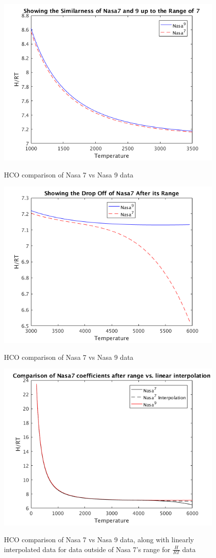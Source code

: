 \documentclass{article}
\begin{document}
\begin{figure}
  \centering
  \includegraphics[width=.8\linewidth]{./NasaPlots/H2.png}
  \label{fig:H2}
  \caption{HCO comparison of Nasa 7 vs Nasa 9 data}
\end{figure}


\begin{figure}
  \centering
  \includegraphics[width=.8\linewidth]{./NasaPlots/H3.png}
  \label{fig:H3}
  \caption{HCO comparison of Nasa 7 vs Nasa 9 data}
\end{figure}

\begin{figure}
  \centering
  \includegraphics[width=.8\linewidth]{./NasaPlots/HT.png}
  \label{fig:HT}
  \caption{HCO comparison of Nasa 7 vs Nasa 9 data, along with linearly interpolated data for data outside of Nasa 7's range for $\frac{H}{RT}$ data}
\end{figure}
\end{document}
